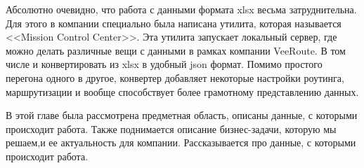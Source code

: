 Абсолютно очевидно, что работа с данными формата xlsx весьма затруднительна. Для этого в компании специально была написана утилита, которая называется <<Mission Control Center>>. Эта утилита запускает локальный сервер, где можно делать различные вещи с данными в рамках компании VeeRoute. В том числе и конвертировать из xlsx в удобный json формат. Помимо простого перегона одного в другое, конвертер добавляет некоторые настройки роутинга, маршрутизации и вообще способствует более грамотному представлению данных.
 

\chapterconclusion

В этой главе была рассмотрена предметная область, описаны данные, с которыми происходит работа.
Также поднимается описание бизнес-задачи, которую мы решаем,и ее актуальность для компании.
Рассказывается про данные, с которыми происходит работа.